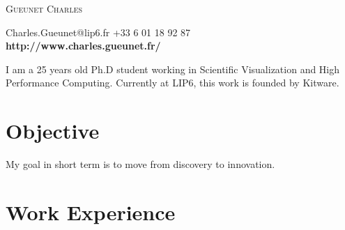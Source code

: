 \documentclass[a4paper, oneside, final]{scrartcl} %
\begin{document}
\begin{center} %


{\fontsize{36}{36}\selectfont\scshape
Gueunet Charles} %

{\Large\Letter} Charles.Gueunet@lip6.fr \hspace{0.2cm} {\Large\Telefon} +33 6 01 18 92 87 \\
\textbf{http://www.charles.gueunet.fr/}


\vspace{0.2cm} %


\begin{flushleft}
  I am a 25 years old Ph.D student working in Scientific Visualization and High Performance Computing.
  Currently at LIP6, this work is founded by Kitware.
\end{flushleft}


\section{Objective}

My goal in short term is to move from discovery to innovation.


\section{Work Experience}


\end{center}
\end{document}
